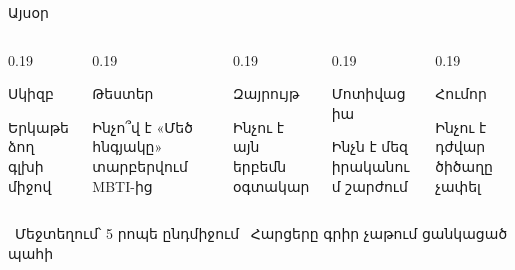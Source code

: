 \begin{frame}{Այսօր}
  \begin{columns}[T]
    \begin{column}{0.19\textwidth}
      \begin{card}[left=1.3mm, right=1.3mm, colback=butter!45!cream]
        \centering{}\par\smallskip
        {\blackfont Սկիզբ}\par\smallskip
        \raggedright Երկաթե ձող գլխի միջով
      \end{card}
    \end{column}
    \begin{column}{0.19\textwidth}
      \begin{card}[left=1.3mm, right=1.3mm, colback=lavender!45!cream]
        \centering{}\par\smallskip
        {\blackfont Թեստեր}\par\smallskip
        \raggedright Ինչո՞վ է «Մեծ հնգյակը» տարբերվում MBTI-ից
      \end{card}
    \end{column}
    \begin{column}{0.19\textwidth}
      \begin{card}[left=1.3mm, right=1.3mm, colback=brainpink!40!cream]
        \centering{}\par\smallskip
        {\blackfont Զայրույթ}\par\smallskip
        \raggedright Ինչու է այն երբեմն օգտակար
      \end{card}
    \end{column}
    \begin{column}{0.19\textwidth}
      \begin{card}[left=1.3mm, right=1.3mm, colback=mint!45!cream]
        \centering{}\par\smallskip
        {\blackfont Մոտիվացիա}\par\smallskip
        \raggedright Ինչն է մեզ իրականում շարժում
      \end{card}
    \end{column}
    \begin{column}{0.19\textwidth}
      \begin{card}[left=1.3mm, right=1.3mm, colback=peach!45!cream]
        \centering{}\par\smallskip
        {\blackfont Հումոր}\par\smallskip
        \raggedright Ինչու է դժվար ծիծաղը չափել
      \end{card}
    \end{column}
  \end{columns}
  \vspace{4mm}
  \centering
  {\small {}\ Մեջտեղում՝ 5 րոպե ընդմիջում \qquad {}\ Հարցերը գրիր չաթում ցանկացած պահի}
\end{frame}
